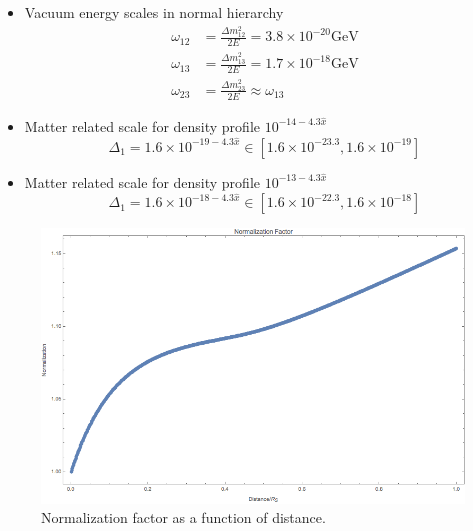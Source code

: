 \documentclass{tufte-handout}
\begin{document}
\begin{itemize}
\item Vacuum energy scales in normal hierarchy
\begin{align*}
\omega_{12}&= \frac{\Delta m_{12}^2}{2E} = 3.8\times 10^{-20}\mathrm{GeV}\\
\omega_{13}&= \frac{\Delta m_{13}^2}{2E} = 1.7\times 10^{-18}\mathrm{GeV}\\
\omega_{23}&= \frac{\Delta m_{23}^2}{2E} \approx \omega_{13}
\end{align*}
\item Matter related scale for density profile $10^{-14-4.3\hat x}$
\begin{equation*}
\Delta_1 = 1.6\times 10^{-19-4.3\hat x}\in [1.6\times 10^{-23.3},1.6\times 10^{-19}]
\end{equation*}

\item Matter related scale for density profile $10^{-13-4.3\hat x}$
\begin{equation*}
\Delta_1 = 1.6\times 10^{-18-4.3\hat x}\in [1.6\times 10^{-22.3},1.6\times 10^{-18}]
\end{equation*}



\end{itemize}



\begin{figure}
\centering
\includegraphics{assets/numericalMSW3Flavor-normalization}
\caption{Normalization factor as a function of distance.}
\label{fig:numericalMSW3Flavor-normalization}
\end{figure}
\end{document}
